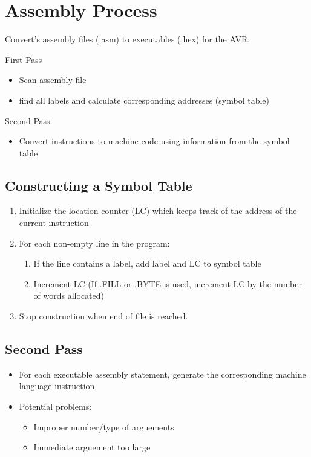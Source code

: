 \documentclass{article}
\begin{document}
\section{Assembly Process}
Convert's assembly files (.asm) to executables (.hex) for the AVR.

First Pass
\begin{itemize}
  \item Scan assembly file
  \item find all labels and calculate corresponding addresses (symbol table)
\end{itemize}

Second Pass
\begin{itemize}
  \item Convert instructions to machine code using information from the symbol table
\end{itemize}

\subsection{Constructing a Symbol Table}
\begin{enumerate}
  \item Initialize the location counter (LC) which keeps track of the address of the current instruction
  \item For each non-empty line in the program:
  \begin{enumerate}
    \item If the line contains a label, add label and LC to symbol table
    \item Increment LC (If .FILL or .BYTE is used, increment LC by the number of words allocated)
  \end{enumerate}
  \item Stop construction when end of file is reached.
\end{enumerate}

\subsection{Second Pass}
\begin{itemize}
  \item For each executable assembly statement, generate the corresponding machine language instruction
  \item Potential problems:
  \begin{itemize}
    \item Improper number/type of arguements
    \item Immediate arguement too large
  \end{itemize}
\end{itemize}
\end{document}

